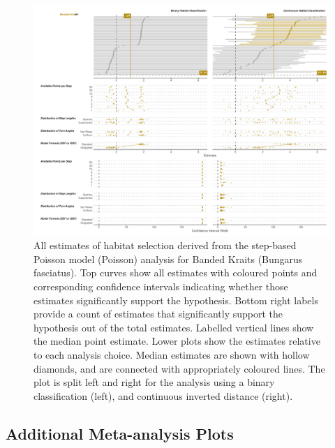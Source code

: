 \documentclass[10pt,a4paper]{article}
\begin{document}
\begin{figure}
\includegraphics[width=1\linewidth]{../../figures/specCurve_Banded Krait_pois} \caption{All estimates of habitat selection derived from the step-based Poisson model (Poisson) analysis for Banded Kraits (Bungarus fasciatus). Top curves show all estimates with coloured points and corresponding confidence intervals indicating whether those estimates significantly support the hypothesis. Bottom right labels provide a count of estimates that significantly support the hypothesis out of the total estimates. Labelled vertical lines show the median point estimate. Lower plots show the estimates relative to each analysis choice. Median estimates are shown with hollow diamonds, and are connected with appropriately coloured lines. The plot is split left and right for the analysis using a binary classification (left), and continuous inverted distance (right).}\label{fig:specCurvePoisBUFA}
\end{figure}

\subsection{Additional Meta-analysis Plots}\label{additional-meta-analysis-plots}
\end{document}

